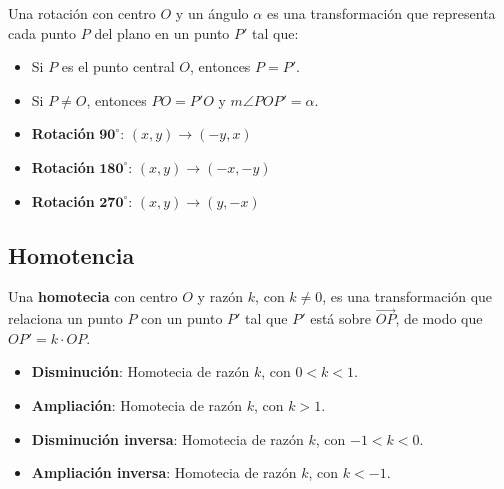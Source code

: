 Una rotación con centro $O$ y un ángulo $\alpha$ es una transformación que representa cada punto $P$ del plano en un punto $P'$ tal que:

\begin{itemize}
    \item Si $P$ es el punto central $O$, entonces $P = P'$.
    \item Si $P \neq O$, entonces $PO = P'O$ y $m\angle{POP'} = \alpha$.
\end{itemize}

\begin{itemize}
    \item \textbf{Rotación} $\mathbf{90^{\circ}}$: $(x,y) \to (-y,x)$
    \item \textbf{Rotación} $\mathbf{180^{\circ}}$: $(x,y) \to (-x,-y)$
    \item \textbf{Rotación} $\mathbf{270^{\circ}}$: $(x,y) \to (y,-x)$
\end{itemize}


\subsection{Homotencia}

Una \textbf{homotecia} con centro $O$ y razón $k$, con $k \neq 0$, es una transformación que relaciona un punto $P$ con un punto $P'$ tal que $P'$ está sobre $\overrightarrow{OP}$, de modo que $OP' = k \cdot OP$.

\begin{itemize}
    \item \textbf{Disminución}: Homotecia de razón $k$, con $0 < k < 1$.
    \item \textbf{Ampliación}: Homotecia de razón $k$, con $k > 1$.
    \item \textbf{Disminución inversa}: Homotecia de razón $k$, con $-1 < k < 0$.
    \item \textbf{Ampliación inversa}: Homotecia de razón $k$, con $k < -1$.
\end{itemize}